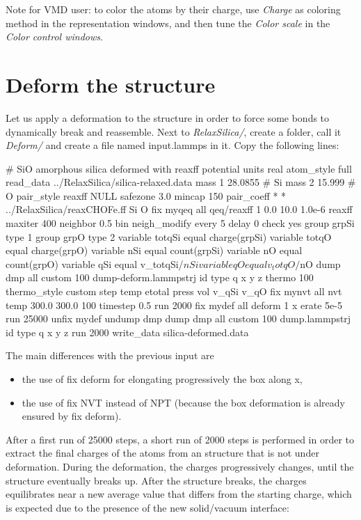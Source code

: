 Note for VMD user: to color the atoms by their charge, use \textit{Charge} as coloring method in the 
representation windows, and then tune the \textit{Color scale} in the \textit{Color control windows}.

\section{Deform the structure}

\noindent Let us apply a deformation to the structure in order to force some bonds 
to dynamically break and reassemble. 
Next to \textit{RelaxSilica/}, create a folder, call it \textit{Deform/} and create a
file named input.lammps in it. Copy the following lines:

\begin{lcverbatim}
# SiO amorphous silica deformed with reaxff potential
units real
atom_style full
read_data ../RelaxSilica/silica-relaxed.data
mass 1 28.0855 # Si
mass 2 15.999 # O
pair_style reaxff NULL safezone 3.0 mincap 150
pair_coeff * * ../RelaxSilica/reaxCHOFe.ff Si O
fix myqeq all qeq/reaxff 1 0.0 10.0 1.0e-6 reaxff maxiter 400
neighbor 0.5 bin
neigh_modify every 5 delay 0 check yes 
group grpSi type 1
group grpO type 2
variable totqSi equal charge(grpSi)
variable totqO equal charge(grpO)
variable nSi equal count(grpSi)
variable nO equal count(grpO)
variable qSi equal v_totqSi/${nSi}
variable qO equal v_totqO/${nO}
dump dmp all custom 100 dump-deform.lammpstrj id type q x y z
thermo 100
thermo_style custom step temp etotal press vol v_qSi v_qO
fix mynvt all nvt temp 300.0 300.0 100
timestep 0.5 
run 2000
fix mydef all deform 1 x erate 5e-5
run 25000
unfix mydef
undump dmp
dump dmp all custom 100 dump.lammpstrj id type q x y z
run 2000
write_data silica-deformed.data
\end{lcverbatim}

\noindent The main differences with the previous input are
\begin{itemize}
\item the use of fix deform for elongating progressively the box along x,
\item the use of fix NVT instead of NPT (because the box deformation is already ensured by fix deform).
\end{itemize}

After a first run of 25000 steps, a short run of 2000 steps is performed 
in order to extract the final charges of the atoms from an structure that is not 
under deformation.
During the deformation, the charges progressively changes, until the structure eventually
breaks up. After the structure breaks, the charges equilibrates near a new 
average value that differs from the starting charge, which is expected due to the
presence of the new solid/vacuum interface:

